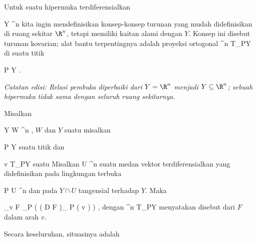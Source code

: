 \setcounter{section}{6}


Untuk suatu hipermuka terdiferensialkan

\mavergleichskette
{\vergleichskette
{ Y
}
{ \subseteq }{ \R^n
}
{  }{
}
{    }{
}
{   }{
}
}
{}{}{}
kita ingin mendefinisikan konsep-konsep turunan yang mudah didefinisikan di ruang sekitar $\R^n$, tetapi memiliki kaitan alami dengan $Y$. Konsep ini disebut turunan kovarian; alat bantu terpentingnya adalah proyeksi ortogonal
 {\R^n } { T_PY
} {}
di suatu titik

\mavergleichskette
{\vergleichskette
{ P
}
{ \in }{ Y
}
{  }{
}
{    }{
}
{   }{
}
}
{}{}{.}

\emph{Catatan edisi: Relasi pembuka diperbaiki dari $Y=\R^n$ menjadi $Y\subseteq\R^n$; sebuah hipermuka tidak sama dengan seluruh ruang sekitarnya.}

{}
{

Misalkan

\mavergleichskette
{\vergleichskette
{ Y
}
{ \subseteq }{ W
}
{ \subseteq }{ \R^n
}
{    }{
}
{   }{
}
}
{}{}{,}
$W$
dan $Y$ suatu
misalkan

\mavergleichskette
{\vergleichskette
{ P
}
{ \in }{ Y
}
{  }{
}
{    }{
}
{   }{
}
}
{}{}{}
suatu titik dan

\mavergleichskette
{\vergleichskette
{ v
}
{ \in }{ T_PY
}
{  }{
}
{    }{
}
{   }{
}
}
{}{}{}
suatu
Misalkan
 { U} { \R^n
} {}
suatu medan vektor terdiferensialkan yang didefinisikan pada lingkungan terbuka

\mavergleichskette
{\vergleichskette
{ P
}
{ \in }{ U
}
{ \subseteq }{ \R^n
}
{    }{
}
{   }{
}
}
{}{}{}
dan pada $Y \cap U$ tangensial terhadap $Y$. Maka

\mavergleichskettedisp
{\vergleichskette
{ \nabla_v F
}
{ } { \pi_P   \left(  \left(  D F   \right)_{ P } \left(  v  \right)  \right)
}
{ } {
}
{ } {
}
{ } {
}
}
{}{}{,}
dengan
 {\R^n } { T_PY
} {}
menyatakan
disebut
dari $F$ dalam arah $v$.

}

Secara keseluruhan, situasinya adalah

 {  }

